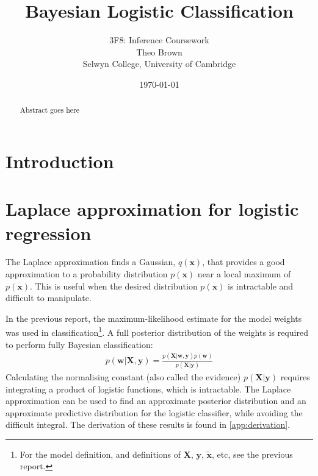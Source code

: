\documentclass[a4paper]{article}
\begin{document}
    \title{Bayesian Logistic Classification}
    \author{3F8: Inference Coursework \\ Theo Brown \\ Selwyn College, University of Cambridge}
    \date{\today}
    \maketitle

    \begin{abstract}
        Abstract goes here
    \end{abstract}
    
    \section{Introduction}\label{sec:introduction}

    \section{Laplace approximation for logistic regression}
    The Laplace approximation finds a Gaussian, $q(\bm{x})$, that provides a good approximation to a probability distribution $p(\bm{x})$ near a local maximum of $p(\bm{x})$.
    This is useful when the desired distribution $p(\bm{x})$ is intractable and difficult to manipulate.

    In the previous report, the maximum-likelihood estimate for the model weights was used in classification\footnote{For the model definition, and definitions of $\bm{X}$, $\bm{y}$, $\tilde{\bm{x}}$, etc, see the previous report.}.
    A full posterior distribution of the weights is required to perform fully Bayesian classification:
    \begin{align}
        p(\bm{w} | \bm{X}, \bm{y}) = \frac{p(\bm{X} | \bm{w}, \bm{y}) p(\bm w)}{p(\bm{X} | \bm{y})}
        \label{eq:posterior}
    \end{align}
    Calculating the normalising constant (also called the evidence) $p(\bm{X} | \bm{y})$ requires integrating a product of logistic functions, which is intractable.
    The Laplace approximation can be used to find an approximate posterior distribution and an approximate predictive distribution for the logistic classifier, while avoiding the difficult integral.
    The derivation of these results is found in \autoref{app:derivation}.
\end{document}
